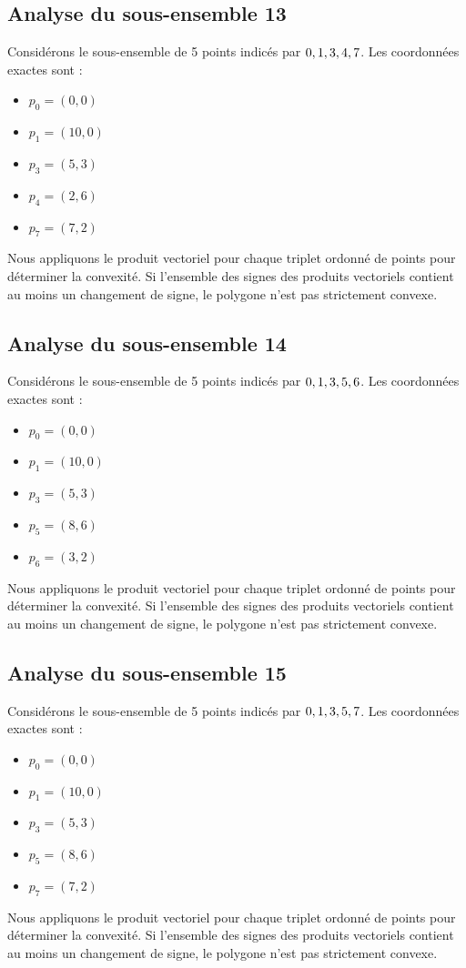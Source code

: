 \documentclass[11pt]{article}
\begin{document}
\subsection{Analyse du sous-ensemble 13}
Considérons le sous-ensemble de 5 points indicés par $\\{ 0, 1, 3, 4, 7 \\}$.
Les coordonnées exactes sont :
\begin{itemize}
\item $p_0 = (0, 0)$
\item $p_1 = (10, 0)$
\item $p_3 = (5, 3)$
\item $p_4 = (2, 6)$
\item $p_7 = (7, 2)$
\end{itemize}
Nous appliquons le produit vectoriel pour chaque triplet ordonné de points pour déterminer la convexité. Si l'ensemble des signes des produits vectoriels contient au moins un changement de signe, le polygone n'est pas strictement convexe.
\newpage

\subsection{Analyse du sous-ensemble 14}
Considérons le sous-ensemble de 5 points indicés par $\\{ 0, 1, 3, 5, 6 \\}$.
Les coordonnées exactes sont :
\begin{itemize}
\item $p_0 = (0, 0)$
\item $p_1 = (10, 0)$
\item $p_3 = (5, 3)$
\item $p_5 = (8, 6)$
\item $p_6 = (3, 2)$
\end{itemize}
Nous appliquons le produit vectoriel pour chaque triplet ordonné de points pour déterminer la convexité. Si l'ensemble des signes des produits vectoriels contient au moins un changement de signe, le polygone n'est pas strictement convexe.
\newpage

\subsection{Analyse du sous-ensemble 15}
Considérons le sous-ensemble de 5 points indicés par $\\{ 0, 1, 3, 5, 7 \\}$.
Les coordonnées exactes sont :
\begin{itemize}
\item $p_0 = (0, 0)$
\item $p_1 = (10, 0)$
\item $p_3 = (5, 3)$
\item $p_5 = (8, 6)$
\item $p_7 = (7, 2)$
\end{itemize}
Nous appliquons le produit vectoriel pour chaque triplet ordonné de points pour déterminer la convexité. Si l'ensemble des signes des produits vectoriels contient au moins un changement de signe, le polygone n'est pas strictement convexe.
\newpage
\end{document}
